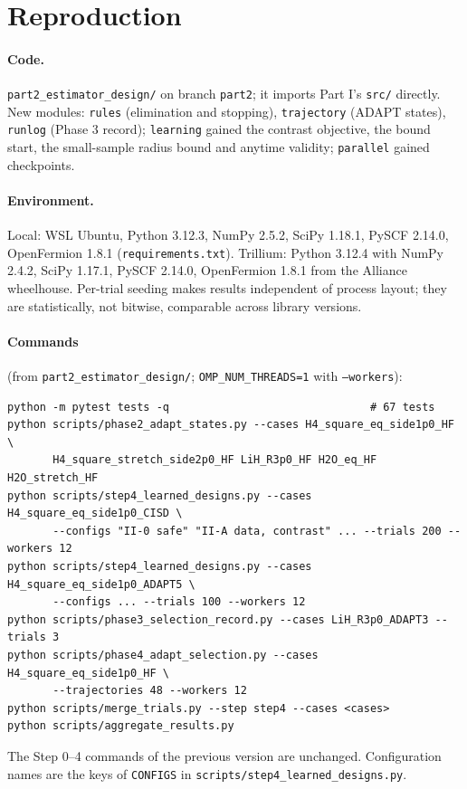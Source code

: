 \documentclass[10.5pt]{article}
\newcommand{\code}[1]{\texttt{#1}}
\begin{document}
\section{Reproduction}
\label{sec:reproduction}

\paragraph{Code.}
\code{part2\_estimator\_design/} on branch \code{part2}; it imports Part I's \code{src/} directly. New modules: \code{rules} (elimination and stopping), \code{trajectory} (ADAPT states), \code{runlog} (Phase 3 record); \code{learning} gained the contrast objective, the bound start, the small-sample radius bound and anytime validity; \code{parallel} gained checkpoints.

\paragraph{Environment.}
Local: WSL Ubuntu, Python 3.12.3, NumPy 2.5.2, SciPy 1.18.1, PySCF 2.14.0, OpenFermion 1.8.1 (\code{requirements.txt}). Trillium: Python 3.12.4 with NumPy 2.4.2, SciPy 1.17.1, PySCF 2.14.0, OpenFermion 1.8.1 from the Alliance wheelhouse. Per-trial seeding makes results independent of process layout; they are statistically, not bitwise, comparable across library versions.

\paragraph{Commands}
(from \code{part2\_estimator\_design/}; \code{OMP\_NUM\_THREADS=1} with \code{--workers}):
\begin{verbatim}
python -m pytest tests -q                               # 67 tests
python scripts/phase2_adapt_states.py --cases H4_square_eq_side1p0_HF \
       H4_square_stretch_side2p0_HF LiH_R3p0_HF H2O_eq_HF H2O_stretch_HF
python scripts/step4_learned_designs.py --cases H4_square_eq_side1p0_CISD \
       --configs "II-0 safe" "II-A data, contrast" ... --trials 200 --workers 12
python scripts/step4_learned_designs.py --cases H4_square_eq_side1p0_ADAPT5 \
       --configs ... --trials 100 --workers 12
python scripts/phase3_selection_record.py --cases LiH_R3p0_ADAPT3 --trials 3
python scripts/phase4_adapt_selection.py --cases H4_square_eq_side1p0_HF \
       --trajectories 48 --workers 12
python scripts/merge_trials.py --step step4 --cases <cases>
python scripts/aggregate_results.py
\end{verbatim}
The Step 0--4 commands of the previous version are unchanged. Configuration names are the keys of \code{CONFIGS} in \code{scripts/step4\_learned\_designs.py}.
\end{document}
